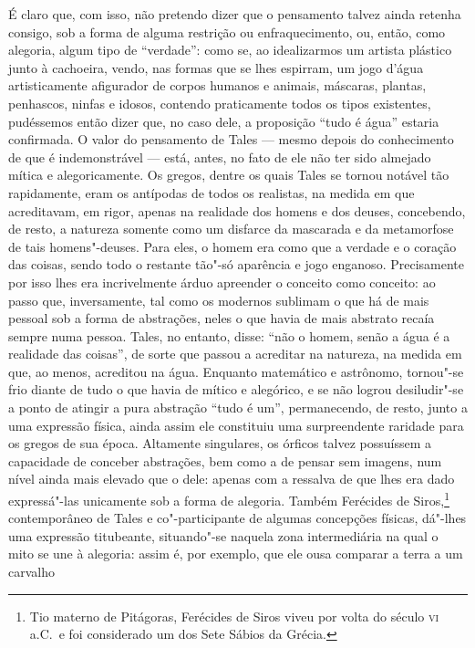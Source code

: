 É claro que, com isso, não pretendo dizer que o pensamento talvez ainda
retenha consigo, sob a forma de alguma restrição ou enfraquecimento, ou,
então, como alegoria, algum tipo de ``verdade'': como se, ao idealizarmos um
artista plástico junto à cachoeira, vendo, nas formas que se lhes espirram,
um jogo d'água artisticamente afigurador de corpos humanos e animais,
máscaras, plantas, penhascos, ninfas e idosos, contendo praticamente todos os
tipos existentes, pudéssemos então dizer que, no caso dele, a proposição
``tudo é água'' estaria confirmada. O valor do pensamento de Tales --- mesmo
depois do \label{pensamentodetales} conhecimento de que é
indemonstrável --- está, antes, no fato de ele não ter sido almejado mítica e
alegoricamente. Os gregos, dentre os quais Tales se tornou notável tão
rapidamente, eram os antípodas de todos os realistas, na medida em que
acreditavam, em rigor, apenas na realidade dos homens e dos deuses,
concebendo, de resto, a natureza somente como um disfarce da mascarada e da
metamorfose de tais homens"-deuses. Para eles, o homem era como que a verdade
e o coração das coisas, sendo todo o restante tão"-só aparência e jogo
enganoso. Precisamente por isso lhes era incrivelmente árduo apreender o
conceito como conceito: ao passo \label{incrivelmentearduo} que,
inversamente, tal como os modernos sublimam o que há de mais pessoal sob a
forma de abstrações, neles o que havia de mais abstrato recaía sempre numa
pessoa. Tales, no entanto, disse: ``não o homem, senão a água é a realidade
das coisas'', de sorte que passou a acreditar na natureza, na medida em que,
ao menos, acreditou na água. Enquanto matemático e astrônomo, tornou"-se frio
diante de tudo o que havia de mítico e alegórico, e se não logrou
desiludir"-se a ponto de atingir a pura abstração ``tudo é um'',
permanecendo, de resto, junto a uma expressão física, ainda assim ele
constituiu uma surpreendente raridade para os gregos de sua época. Altamente
singulares, os órficos talvez possuíssem a capacidade de conceber abstrações,
bem como a de pensar sem imagens, num nível ainda mais elevado que o dele:
apenas com a ressalva de que lhes era dado expressá"-las unicamente sob a
forma de alegoria. Também Ferécides de Siros,\footnote{Tio materno de
Pitágoras, Ferécides de Siros viveu por volta do século \textsc{vi} a.C.~e
foi considerado um dos Sete Sábios da Grécia.} contemporâneo de Tales e
co"-participante de algumas concepções físicas, dá"-lhes uma expressão
titubeante, situando"-se naquela zona intermediária na qual o mito se une à
alegoria: assim é, por exemplo, que ele ousa comparar a terra a um carvalho

